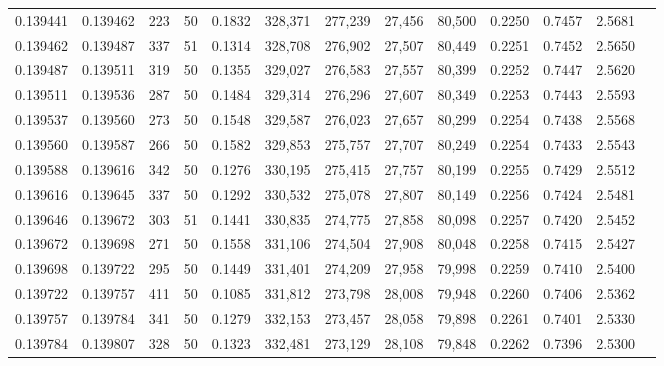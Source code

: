 \begin{tabular}{rrrrrrrrrrrrr}
0.139441 & 0.139462 &   223 &  50 &                                     0.1832 & 328,371 & 277,239 &  27,456 &  80,500 & 0.2250 & 0.7457 & 2.5681 \\
0.139462 & 0.139487 &   337 &  51 &                                     0.1314 & 328,708 & 276,902 &  27,507 &  80,449 & 0.2251 & 0.7452 & 2.5650 \\
0.139487 & 0.139511 &   319 &  50 &                                     0.1355 & 329,027 & 276,583 &  27,557 &  80,399 & 0.2252 & 0.7447 & 2.5620 \\
0.139511 & 0.139536 &   287 &  50 &                                     0.1484 & 329,314 & 276,296 &  27,607 &  80,349 & 0.2253 & 0.7443 & 2.5593 \\
0.139537 & 0.139560 &   273 &  50 &                                     0.1548 & 329,587 & 276,023 &  27,657 &  80,299 & 0.2254 & 0.7438 & 2.5568 \\
0.139560 & 0.139587 &   266 &  50 &                                     0.1582 & 329,853 & 275,757 &  27,707 &  80,249 & 0.2254 & 0.7433 & 2.5543 \\
0.139588 & 0.139616 &   342 &  50 &                                     0.1276 & 330,195 & 275,415 &  27,757 &  80,199 & 0.2255 & 0.7429 & 2.5512 \\
0.139616 & 0.139645 &   337 &  50 &                                     0.1292 & 330,532 & 275,078 &  27,807 &  80,149 & 0.2256 & 0.7424 & 2.5481 \\
0.139646 & 0.139672 &   303 &  51 &                                     0.1441 & 330,835 & 274,775 &  27,858 &  80,098 & 0.2257 & 0.7420 & 2.5452 \\
0.139672 & 0.139698 &   271 &  50 &                                     0.1558 & 331,106 & 274,504 &  27,908 &  80,048 & 0.2258 & 0.7415 & 2.5427 \\
0.139698 & 0.139722 &   295 &  50 &                                     0.1449 & 331,401 & 274,209 &  27,958 &  79,998 & 0.2259 & 0.7410 & 2.5400 \\
0.139722 & 0.139757 &   411 &  50 &                                     0.1085 & 331,812 & 273,798 &  28,008 &  79,948 & 0.2260 & 0.7406 & 2.5362 \\
0.139757 & 0.139784 &   341 &  50 &                                     0.1279 & 332,153 & 273,457 &  28,058 &  79,898 & 0.2261 & 0.7401 & 2.5330 \\
0.139784 & 0.139807 &   328 &  50 &                                     0.1323 & 332,481 & 273,129 &  28,108 &  79,848 & 0.2262 & 0.7396 & 2.5300 \\

\end{tabular}
